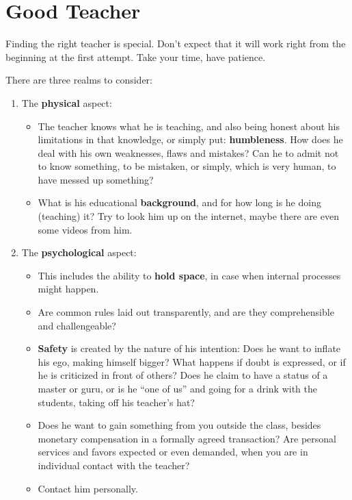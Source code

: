 \section{Good Teacher}\label{sec:good-teacher}

Finding the right teacher is special.
Don’t expect that it will work right from the beginning at the first attempt.
Take your time, have patience.

There are three realms to consider:

\begin{enumerate}
    \item The \textbf{physical} aspect:
    \begin{itemize}
        \item The teacher knows what he is teaching, and also being honest about his limitations in that knowledge, or simply put: \textbf{humbleness}.
        How does he deal with his own weaknesses, flaws and mistakes?
        Can he to admit not to know something, to be mistaken, or simply, which is very human, to have messed up something?
        \item What is his educational \textbf{background}, and for how long is he doing (teaching) it?
        Try to look him up on the internet, maybe there are even some videos from him.
    \end{itemize}
    \item The \textbf{psychological} aspect:
    \begin{itemize}
        \item This includes the ability to \textbf{hold space}, in case when internal processes might happen.
        \item Are common rules laid out transparently, and are they comprehensible and challengeable?
        \item \textbf{Safety} is created by the nature of his intention: Does he want to inflate his ego, making himself bigger?
		What happens if doubt is expressed, or if he is criticized in front of others?
        Does he claim to have a status of a master or guru, or is he ``one of us'' and going for a drink with the students, taking off his teacher's hat?
        \item Does he want to gain something from you outside the class, besides monetary compensation in a formally agreed transaction?
        Are personal services and favors expected or even demanded, when you are in individual contact with the teacher?
        \item Contact him personally.

\end{itemize}
\end{enumerate}
